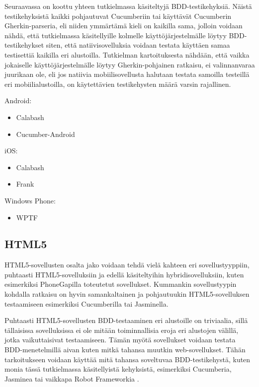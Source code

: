 \documentclass[finnish,nonumbib,nocopyright]{gradu2}
\begin{document}
Seuraavassa on koottu yhteen tutkielmassa käsiteltyjä BDD-testikehyksiä. Näistä testikehyksistä kaikki pohjautuvat Cucumberiin tai käyttävät Cucumberin Gherkin-parseria, eli niiden ymmärtämä kieli on kaikilla sama, jolloin voidaan nähdä, että tutkielmassa käsitellyille kolmelle käyttöjärjestelmälle löytyy BDD-testikehykset siten, että natiivisovelluksia voidaan testata käyttäen samaa testisettiä kaikilla eri alustoilla. Tutkielman kartoituksesta nähdään, että vaikka jokaiselle käyttöjärjestelmälle löytyy Gherkin-pohjainen ratkaisu, ei valinnanvaraa juurikaan ole, eli jos natiivia mobiilisovellusta halutaan testata samoilla testeillä eri mobiilialustoilla, on käytettävien testikehysten määrä varsin rajallinen.

Android:
\begin{itemize}
\item Calabash
\item Cucumber-Android
\end{itemize}

iOS:
\begin{itemize}
\item Calabash
\item Frank
\end{itemize}

Windows Phone:
\begin{itemize}
\item WPTF
\end{itemize}

\newpage
\subsection{HTML5}
HTML5-sovellusten osalta jako voidaan tehdä vielä kahteen eri sovellustyyppiin, puhtaasti HTML5-sovelluksiin ja edellä käsiteltyihin hybridisovelluksiin, kuten esimerkiksi PhoneGapilla toteutetut sovellukset. Kummankin sovellustyypin kohdalla ratkaisu on hyvin samankaltainen ja pohjautuukin HTML5-sovelluksen testaamiseen esimerkiksi Cucumberilla tai Jasminella.

Puhtaasti HTML5-sovellusten BDD-testaaminen eri alustoille on triviaalia, sillä tällaisissa sovelluksissa ei ole mitään toiminnallisia eroja eri alustojen välillä, jotka vaikuttaisivat testaamiseen. Tämän myötä sovellukset voidaan testata BDD-menetelmillä aivan kuten mitkä tahansa muutkin web-sovellukset. Tähän tarkoitukseen voidaan käyttää mitä tahansa soveltuvaa BDD-testikehystä, kuten monia tässä tutkielmassa käsitellyistä kehyksistä, esimerkiksi Cucumberia, Jasminea tai vaikkapa Robot Frameworkia \cite{robotframework}.
\end{document}
